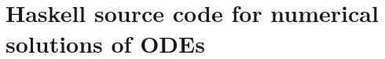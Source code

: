 \chapter{Haskell source code for numerical solutions of ODEs} 
\label{app:haskellsolver}
\lstset{style=haskellStyle}







